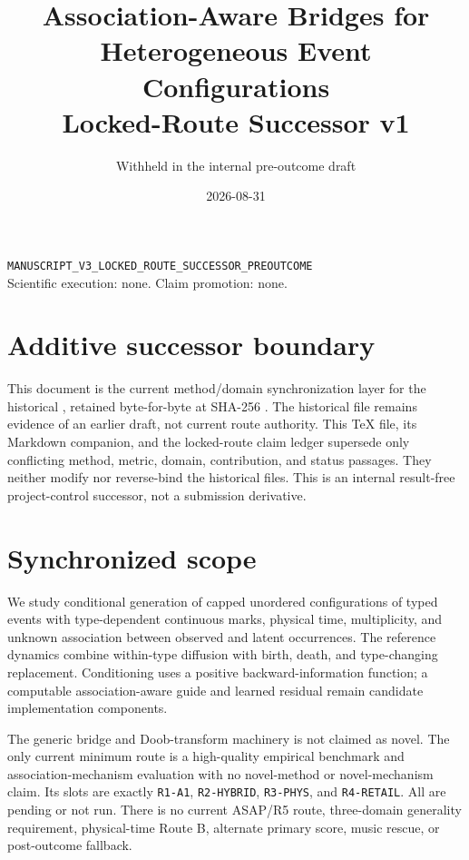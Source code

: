 \documentclass[11pt]{article}
\title{Association-Aware Bridges for Heterogeneous Event Configurations\\
Locked-Route Successor v1}
\author{Withheld in the internal pre-outcome draft}
\date{2026-08-31}
\newcommand{\state}[1]{\texttt{#1}}
\begin{document}
\maketitle

\begin{center}
\state{MANUSCRIPT\_V3\_LOCKED\_ROUTE\_SUCCESSOR\_PREOUTCOME}\\
Scientific execution: none. Claim promotion: none.
\end{center}

\section{Additive successor boundary}

This document is the current method/domain synchronization layer for the
historical , retained byte-for-byte at SHA-256
.
The historical file remains evidence of an earlier draft, not current route
authority. This TeX file, its Markdown companion, and the locked-route claim
ledger supersede only conflicting method, metric, domain, contribution, and
status passages. They neither modify nor reverse-bind the historical files.
This is an internal result-free project-control successor, not a submission
derivative.

\section{Synchronized scope}

We study conditional generation of capped unordered configurations of typed
events with type-dependent continuous marks, physical time, multiplicity, and
unknown association between observed and latent occurrences. The reference
dynamics combine within-type diffusion with birth, death, and type-changing
replacement. Conditioning uses a positive backward-information function; a
computable association-aware guide and learned residual remain candidate
implementation components.

The generic bridge and Doob-transform machinery is not claimed as novel. The
only current minimum route is a high-quality empirical benchmark and
association-mechanism evaluation with no novel-method or novel-mechanism
claim. Its slots are exactly \state{R1-A1}, \state{R2-HYBRID},
\state{R3-PHYS}, and \state{R4-RETAIL}. All are pending or not run. There is no
current ASAP/R5 route, three-domain generality requirement, physical-time
Route B, alternate primary score, music rescue, or post-outcome fallback.
\end{document}
